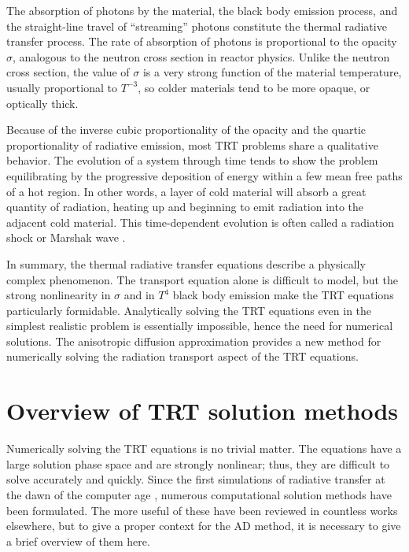 The absorption of photons by the material, the black body emission process, and
the straight-line travel of ``streaming'' photons constitute the
thermal radiative transfer process. The rate of absorption of photons is
proportional to the opacity $\sigma$, analogous to the neutron cross section in
reactor physics. Unlike the neutron cross section, the value of $\sigma$ is
a very strong function of the material temperature, usually proportional to
$T^{-3}$, so colder materials tend to be more opaque, or optically thick.

Because of the inverse cubic proportionality of the opacity and the quartic
proportionality of radiative emission, most TRT problems share a qualitative
behavior.  The evolution of a system through time tends to show the problem
equilibrating by the progressive deposition of energy within a few mean free
paths of a hot region.  In other words, a layer of cold material will absorb
a great quantity of radiation, heating up and beginning to emit radiation
into the adjacent cold material. This time-dependent evolution is often called
a radiation shock or Marshak wave \cite{Mar1958}.

In summary, the thermal radiative transfer equations describe a physically
complex phenomenon.  The transport equation alone is difficult to model, but
the strong nonlinearity in $\sigma$ and in $T^4$ black body emission make the
TRT equations particularly formidable.
Analytically solving the TRT equations even in the simplest realistic problem
is essentially impossible, hence the need for numerical solutions.
The anisotropic diffusion approximation provides a new method for numerically
solving the radiation transport aspect of the TRT equations.

\section{Overview of TRT solution methods}

Numerically solving the TRT equations is no trivial matter. The
equations have
a large solution phase space and are strongly nonlinear; thus,
they are difficult to solve accurately and quickly. Since the first
simulations of radiative transfer at the dawn of the computer age
\cite{Cam1964,Cam1969}, numerous computational solution methods have been
formulated.  The more useful of these have been reviewed in countless
works \cite{Cam1964,Cam1969,Ols2000,Bru2002,Cas2004,Wol2008}
elsewhere, but to give a proper context for the AD method, it is
necessary to give a brief overview of them here.

